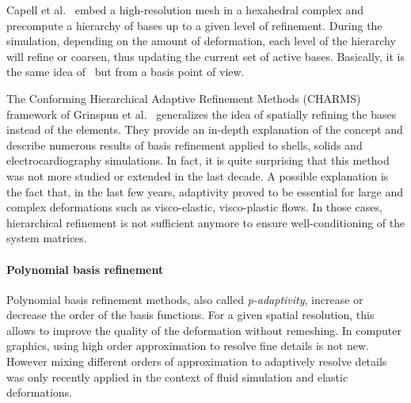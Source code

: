 Capell et al.~\cite{Capell2002} embed a high-resolution mesh in a hexahedral complex and precompute a hierarchy of bases up to a given level of refinement. During the simulation, depending on the amount of deformation, each level of the hierarchy will refine or coarsen, thus updating the current set of active bases. Basically, it is the same idea of~\cite{Debunne2001} but from a basis point of view.

The Conforming Hierarchical Adaptive Refinement Methods (CHARMS) framework of Grinspun et al.~\cite{Grinspun2002} generalizes the idea of spatially refining the bases instead of the elements. They provide an in-depth explanation of the concept and describe numerous results of basis refinement applied to shells, solids and electrocardiography simulations.
In fact, it is quite surprising that this method was not more studied or extended in the last decade. A possible explanation is the fact that, in the last few years, adaptivity proved to be essential for large and complex deformations such as visco-elastic, visco-plastic flows. In those cases, hierarchical refinement is not sufficient anymore to ensure well-conditioning of the system matrices. 

\paragraph*{Polynomial basis refinement}
Polynomial basis refinement methods, also called \emph{p-adaptivity}, increase or decrease the order of the basis functions.
For a given spatial resolution, this allows to improve the quality of the deformation without remeshing. In computer graphics, using high order approximation to resolve fine details is not new. However mixing different orders of approximation to adaptively resolve details was only recently applied in the context of fluid simulation and elastic deformations.

